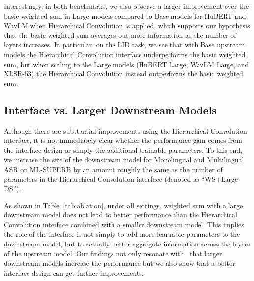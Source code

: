 Interestingly, in both benchmarks, we also observe a larger improvement over the basic weighted sum in Large models compared to Base models for HuBERT and WavLM when Hierarchical Convolution is applied, which supports our hypothesis that the basic weighted sum averages out more information as the number of layers increases.
In particular, on the LID task, we see that with Base upstream models the Hierarchical Convolution interface underperforms the basic weighted sum, but when scaling to the Large models (HuBERT Large, WavLM Large, and XLSR-53) the Hierarchical Convolution instead outperforms the basic weighted sum.


\subsection{Interface vs. Larger Downstream Models}




Although there are substantial improvements using the Hierarchical Convolution interface, it is not immediately clear whether the performance gain comes from the interface design or simply the additional trainable parameters.
To this end, we increase the size of the downstream model for Monolingual and Multilingual ASR on ML-SUPERB by an amount roughly the same as the number of parameters in the Hierarchical Convolution interface (denoted as ``WS+Large DS'').

As shown in Table~\ref{tab:ablation}, under all settings, weighted sum with a large downstream model does not lead to better performance than the Hierarchical Convolution interface combined with a smaller downstream model.
This implies the role of the interface is not simply to add more learnable parameters to the downstream model, but to actually better aggregate information across the layers of the upstream model.
Our findings not only resonate with~\cite{zaiem23b_interspeech} that larger downstream models increase the performance but we also show that a better interface design can get further improvements.

